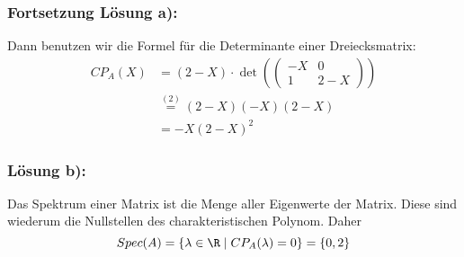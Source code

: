 %
%
\begin{frame}\frametitle{Fortsetzung Lösung a):}
Dann benutzen wir die Formel für die Determinante einer Dreiecksmatrix: \pause
\begin{align*}
CP_A(X)&=(2-X)\cdot\det(\begin{pmatrix}
		-X	&0	\\
		1	&2-X
	\end{pmatrix})\\
&\stackrel{(2)}{=}(2-X)(-X)(2-X)\\
&=-X(2-X)^2
\end{align*}

\end{frame}
%
%
\begin{frame}\frametitle{Lösung b):}
%	
Das Spektrum einer Matrix ist die Menge aller Eigenwerte der Matrix. \pause Diese sind wiederum die Nullstellen des charakteristischen Polynom. \pause Daher
$$
Spec(A)=\{\lambda \in \R \mid CP_A(\lambda)=0\}=\{0,2\}
$$
\end{frame}
%
%

